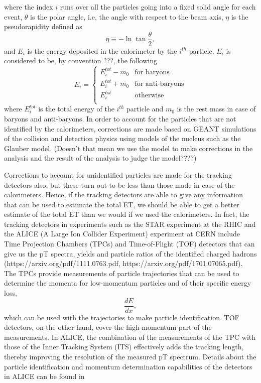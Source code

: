 where the index $i$ runs over all the particles going into a fixed solid angle for each event, $\theta$ is the polar angle, i.e, the angle with respect to the beam axis, $\eta$ is the pseudorapidity defined as 
\begin{equation}\label{eqn:ETDefSum}
\eta\equiv-\ln\tan{\frac{\theta}{2}},
\end{equation}
and $E_{i}$ is the energy deposited in the calorimeter by the $i^{th}$ particle. $E_{i}$ is considered to be, by convention \cite{PhysRevC.89.044905}???, the following
\begin{equation}\label{eqn:EiCaseByCase}
E_{i} = 
	\begin{cases}
	E_{i}^{tot}-m_{0} & \text{for baryons} \\
	E_{i}^{tot}+m_{0} & \text{for anti-baryons} \\	
	E_{i}^{tot} & \text{otherwise} \\
	\end{cases}
\end{equation}
where $E_{i}^{tot}$ is the total energy of the $i^{th}$ particle and  $m_{0}$ is the rest mass in case of baryons and anti-baryons.
In order to account for the particles that are not identified by the calorimeters, corrections are made based on GEANT simulations of the collision and detection physics using models of the nucleus such as the Glauber model. (Doesn't that mean we use the model to make corrections in the analysis and the result of the analysis to judge the model????)

Corrections to account for unidentified particles are made for the tracking detectors also, but these turn out to be less than those made in case of the calorimeters. Hence, if the tracking detectors are able to give any information that can be used to estimate the total ET, we should be able to get a better estimate of the total ET than we would if we used the calorimeters. In fact, the tracking detectors in experiments such as the STAR experiment at the RHIC and the ALICE (A Large Ion Collider Experiment) experiment at CERN include Time Projection Chambers (TPCs) and Time-of-Flight (TOF) detectors that can give us the pT spectra, yields and particle ratios of the identified charged hadrons (https://arxiv.org/pdf/1111.0763.pdf, https://arxiv.org/pdf/1701.07065.pdf). The TPCs provide measurements of particle trajectories that can be used to determine the momenta for low-momentum particles and of their specific energy loss, 
\begin{equation}\label{eqn:specificEnLoss}
	\frac{dE}{dx} ,
\end{equation}
which can be used with the trajectories to make particle identification. TOF detectors, on the other hand, cover the high-momentum part of the measurements. In ALICE, the combination of the measurements of the TPC with those of the Inner Tracking System (ITS) effectively adds the tracking length, thereby improving the resolution of the measured pT spectrum. Details about the particle identification and momentum determination capabilities of the detectors in ALICE can be found in \cite{1748-0221-3-08-S08002} 

